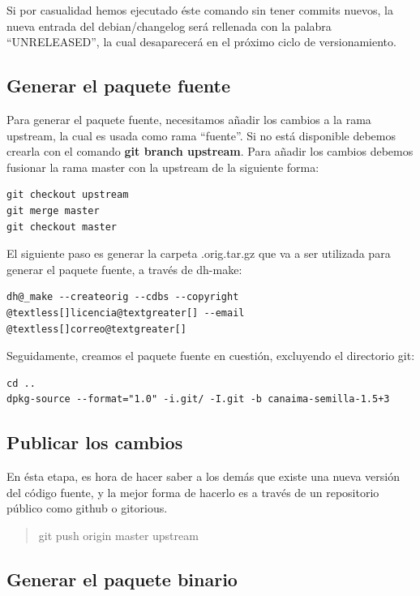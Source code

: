 \documentclass[letterpaper,12pt,spanish]{manual}
\begin{document}
Si por casualidad hemos ejecutado éste comando sin tener commits nuevos, la nueva entrada del debian/changelog será rellenada con la palabra “UNRELEASED”, la cual desaparecerá en el próximo ciclo de versionamiento.


\subsection{Generar el paquete fuente}

Para generar el paquete fuente, necesitamos añadir los cambios a la rama upstream, la cual es usada como rama “fuente”. Si no está disponible debemos crearla con el comando \textbf{git branch upstream}. Para añadir los cambios debemos fusionar la rama master con la upstream de la siguiente forma:

\begin{Verbatim}[commandchars=@\[\]]
git checkout upstream
git merge master
git checkout master
\end{Verbatim}

El siguiente paso es generar la carpeta .orig.tar.gz que va a ser utilizada para generar el paquete fuente, a través de dh-make:

\begin{Verbatim}[commandchars=@\[\]]
dh@_make --createorig --cdbs --copyright @textless[]licencia@textgreater[] --email @textless[]correo@textgreater[]
\end{Verbatim}

Seguidamente, creamos el paquete fuente en cuestión, excluyendo el directorio git:

\begin{Verbatim}[commandchars=@\[\]]
cd ..
dpkg-source --format="1.0" -i.git/ -I.git -b canaima-semilla-1.5+3
\end{Verbatim}


\subsection{Publicar los cambios}

En ésta etapa, es hora de hacer saber a los demás que existe una nueva versión del código fuente, y la mejor forma de hacerlo es a través de un repositorio público como github o gitorious.
\begin{quote}

git push origin master upstream
\end{quote}


\subsection{Generar el paquete binario}
\end{document}
